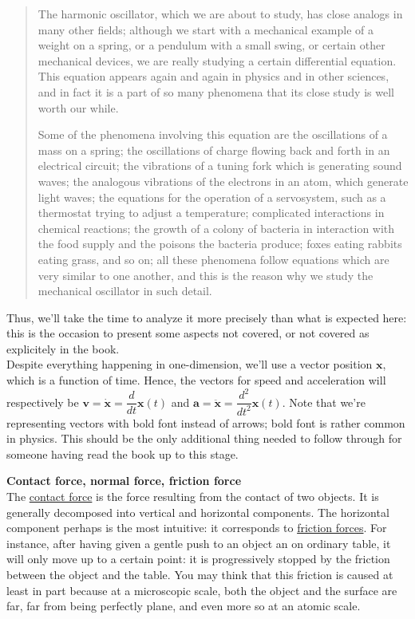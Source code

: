 \documentclass[solutions.tex]{subfiles}
\renewcommand{\bm}[1]{\pmb{#1}}
\begin{document}
\begin{quote}
The harmonic oscillator, which we are about to study, has close analogs in many
other fields; although we start with a mechanical example of a weight on a spring,
or a pendulum with a small swing, or certain other mechanical devices, we are
really studying a certain differential equation. This equation appears again
and again in physics and in other sciences, and in fact it is a part of so
many phenomena that its close study is well worth our while.

Some of the phenomena involving this equation are the oscillations of a
mass on a spring; the oscillations of charge flowing back and forth in
an electrical circuit; the vibrations of a tuning fork which is generating
sound waves; the analogous vibrations of the electrons in an atom, which
generate light waves; the equations for the operation of a servosystem,
such as a thermostat trying to adjust a temperature; complicated
interactions in chemical reactions; the growth of a colony of bacteria
in interaction with the food supply and the poisons the bacteria produce;
foxes eating rabbits eating grass, and so on; all these phenomena follow
equations which are very similar to one another, and this is the reason
why we study the mechanical oscillator in such detail.
\end{quote}

Thus, we'll take the time to analyze it more precisely than what
is expected here: this is the occasion to present some aspects not
covered, or not covered as explicitely in the book. \\

Despite everything happening in one-dimension, we'll use a
vector position $\bm{x}$, which is a function of time. Hence, the vectors
for speed and acceleration will respectively be $\bm{v}=\dot{\bm{x}} =
\dfrac{d}{dt}\bm{x}(t)$ and $\bm{a}=\ddot{\bm{x}} = \dfrac{d^2}{dt^2}\bm{x}(t)$.
Note that we're representing vectors with bold font instead of
arrows; bold font is rather common in physics. This should be the only
additional thing needed to follow through for someone having read the
book up to this stage.

\hr
\textbf{Contact force, normal force, friction force} \\
The \href{https://en.wikipedia.org/wiki/Contact\_force}{contact force}
is the force resulting from the contact of two objects. It is generally decomposed
into vertical and horizontal components. The horizontal component perhaps
is the most intuitive: it corresponds to
\href{https://en.wikipedia.org/wiki/Friction}{friction forces}. For
instance, after having given a gentle push to an object an on ordinary table,
it will only move up to a certain point: it is progressively stopped by
the friction between the object and the table. You may think that this friction
is caused at least in part because at a microscopic scale, both the object
and the surface are far, far from being perfectly plane, and even more
so at an atomic scale. \\
\end{document}
